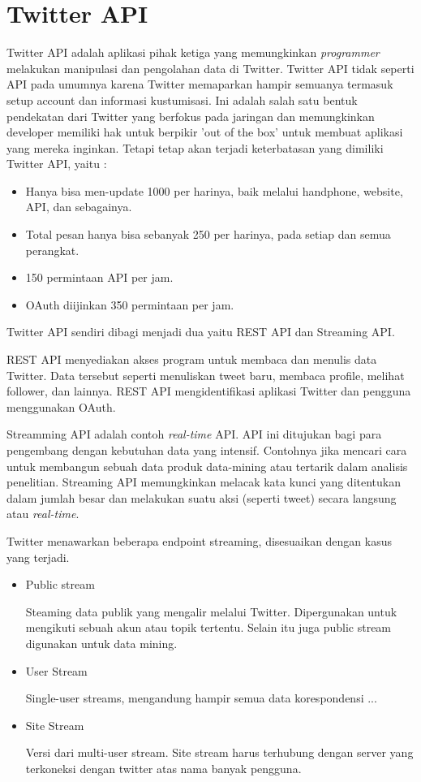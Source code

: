 	

\section{Twitter API}
Twitter API adalah aplikasi pihak ketiga yang memungkinkan \textit{programmer} melakukan manipulasi dan pengolahan data di Twitter. Twitter API tidak seperti API pada umumnya karena Twitter memaparkan hampir semuanya termasuk setup account dan informasi kustumisasi. Ini adalah salah satu bentuk pendekatan dari Twitter yang berfokus pada jaringan dan memungkinkan developer memiliki hak untuk berpikir 'out of the box' untuk membuat aplikasi yang mereka inginkan. Tetapi tetap akan terjadi keterbatasan yang dimiliki Twitter API, yaitu :
\begin{itemize}
	\item Hanya bisa men-update 1000 per harinya, baik melalui handphone, website, API, dan sebagainya.
	\item Total pesan hanya bisa sebanyak 250 per harinya, pada setiap dan semua perangkat.
	\item 150 permintaan API per jam.
	\item OAuth diijinkan 350 permintaan per jam.
\end{itemize}

Twitter API sendiri dibagi menjadi dua yaitu REST API dan Streaming API.


REST API menyediakan akses program untuk membaca dan menulis data Twitter. Data tersebut seperti menuliskan tweet baru, membaca profile, melihat follower, dan lainnya. REST API mengidentifikasi aplikasi Twitter dan pengguna menggunakan OAuth.

Streamming API adalah contoh \textit{real-time} API. API ini ditujukan bagi para pengembang dengan kebutuhan data yang intensif. Contohnya jika mencari cara untuk membangun sebuah data produk data-mining atau tertarik dalam analisis penelitian. Streaming API memungkinkan melacak kata kunci yang ditentukan dalam jumlah besar dan melakukan suatu aksi (seperti tweet) secara langsung atau \textit{real-time}.

Twitter menawarkan beberapa endpoint streaming, disesuaikan dengan kasus yang terjadi. 
\begin{itemize}
	\item Public stream
	
	Steaming data publik yang mengalir melalui Twitter. Dipergunakan untuk mengikuti sebuah akun atau topik tertentu. Selain itu juga public stream digunakan untuk data mining.
	\item User Stream
	
	Single-user streams, mengandung hampir semua data korespondensi ...
	
	\item Site Stream
	
	Versi dari multi-user stream. Site stream harus terhubung dengan server yang terkoneksi dengan twitter atas nama banyak pengguna.
\end{itemize}


